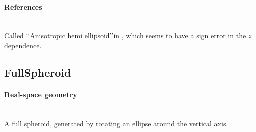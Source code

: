 \paragraph{References}\strut\\
Called \lq\lq Anisotropic hemi ellipsoid\rq\rq in ,
which seems to have a sign error in the $z$ dependence.

\clearpage
\subsection{FullSpheroid} \label{sec:FullSpheroid}

\paragraph{Real-space geometry}\strut\\
A full spheroid, generated by rotating an ellipse around the vertical axis.

\begin{figure}[h]
\hfill
{}
\hfill
{}
\hfill
\end{figure}

